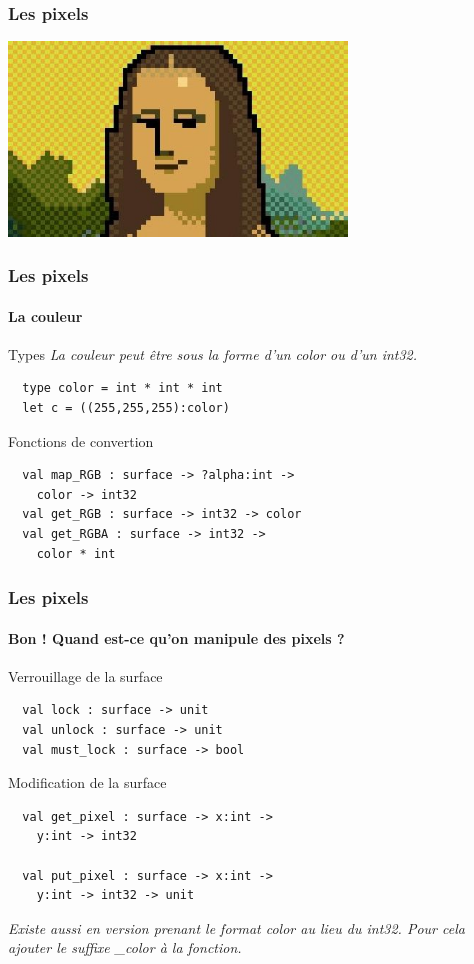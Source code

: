 \begin{frame}
	\frametitle{Les pixels}
	\begin{center}
		\includegraphics[width=9cm]{pics/Joconde-pixel.jpg}
	\end{center}
\end{frame}

\begin{frame}[fragile]
	\frametitle{Les pixels}
	\framesubtitle{La couleur}
	\begin{block}{Types}
		\textit{La couleur peut être sous la forme d'un color ou d'un int32.}
		\begin{lstlisting}
  type color = int * int * int
  let c = ((255,255,255):color)
		\end{lstlisting}
	\end{block}
	\begin{block}{Fonctions de convertion}
		\begin{lstlisting}
  val map_RGB : surface -> ?alpha:int -> 
    color -> int32
  val get_RGB : surface -> int32 -> color
  val get_RGBA : surface -> int32 -> 
    color * int
		\end{lstlisting}
	\end{block}
\end{frame}

\begin{frame}[fragile]
	\frametitle{Les pixels}
	\framesubtitle{\og{}Bon ! Quand est-ce qu'on manipule des pixels ?\fg}
	\begin{block}{Verrouillage de la surface}
		\begin{lstlisting}
  val lock : surface -> unit
  val unlock : surface -> unit
  val must_lock : surface -> bool
		\end{lstlisting}
	\end{block}
	\begin{block}{Modification de la surface}
		\begin{lstlisting}
  val get_pixel : surface -> x:int -> 
    y:int -> int32

  val put_pixel : surface -> x:int -> 
    y:int -> int32 -> unit
		\end{lstlisting}
		\textit{Existe aussi en version prenant le format color au lieu du int32. Pour cela ajouter le suffixe \_color à la fonction.}
	\end{block}
\end{frame}

